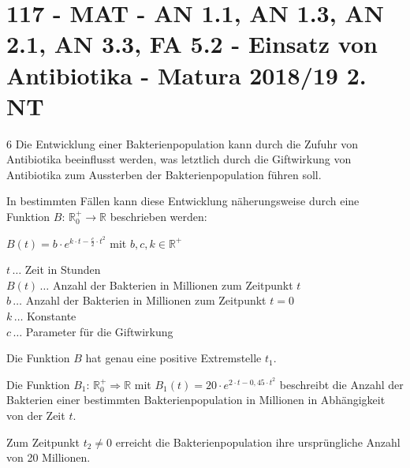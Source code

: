 \section{117 - MAT - AN 1.1, AN 1.3, AN 2.1, AN 3.3, FA 5.2 - Einsatz von Antibiotika - Matura 2018/19 2. NT}

\begin{langesbeispiel} \item[6] %
Die Entwicklung einer Bakterienpopulation kann durch die Zufuhr von Antibiotika beeinflusst werden, was letztlich durch die Giftwirkung von Antibiotika zum Aussterben der Bakterienpopulation führen soll.

In bestimmten Fällen kann diese Entwicklung näherungsweise durch eine Funktion $B$: $\mathbb{R}^+_0\rightarrow\mathbb{R}$ beschrieben werden:

$B(t)=b\cdot e^{k\cdot t-\frac{c}{2}\cdot t^2}$ mit $b,c,k\in\mathbb{R}^+$\vspace{0,3cm}

$t\,\ldots$ Zeit in Stunden\\
$B(t)\,\ldots$ Anzahl der Bakterien in Millionen zum Zeitpunkt $t$\\
$b\,\ldots$ Anzahl der Bakterien in Millionen zum Zeitpunkt $t=0$\\
$k\,\ldots$ Konstante\\
$c\,\ldots$ Parameter für die Giftwirkung%

\begin{aufgabenstellung}
\item Die Funktion $B$ hat genau eine positive Extremstelle $t_1$.%


\item Die Funktion $B_1$: $\mathbb{R}^+_0\Rightarrow\mathbb{R}$ mit $B_1(t)=20\cdot e^{2\cdot t-0,45\cdot t^2}$ beschreibt die Anzahl der Bakterien einer bestimmten Bakterienpopulation in Millionen in Abhängigkeit von der Zeit $t$.
	
	Zum Zeitpunkt $t_2\neq 0$ erreicht die Bakterienpopulation ihre ursprüngliche Anzahl von 20 Millionen.%



\end{aufgabenstellung}
\end{langesbeispiel}
